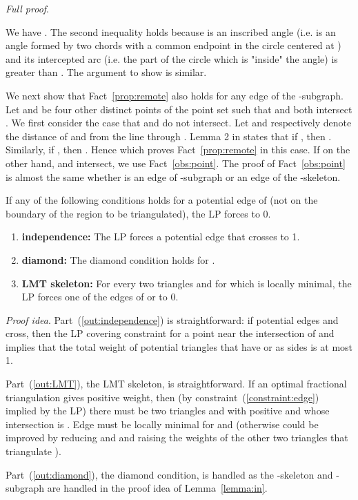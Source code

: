 \documentclass[final]{siamltex}
\newenvironment{proofidea}{\par{\it Proof idea}. \ignorespaces}{}
\newenvironment{fullproof}{\par{\it Full proof}. \ignorespaces}{\endproof}
\begin{document}
\begin{fullproof}
\begin{window}
We have . The second inequality holds because
 is an inscribed angle (i.e. is an angle formed by two chords with a 
common endpoint in the circle centered at ) and its intercepted arc (i.e. the part of the circle 
which is "inside" the angle) is greater than . The argument to show 
is similar.
\end{window}
We next show that Fact~\ref{prop:remote} 
also holds for any edge  of the -subgraph.
Let  and  be four other distinct points of the point set 
such that  and  both intersect .
We first consider the case that  and  do not intersect.
Let  and  respectively denote the distance of  and  from the line through . 
Lemma 2 in \cite{yang1994chain} states that if , then . 
Similarly, if , then . Hence 
which proves Fact~\ref{prop:remote} in this case. 
If on the other hand,  and  intersect, we use Fact~\ref{obs:point}. The proof of 
Fact~\ref{obs:point} is almost the same whether  is an edge of -subgraph or an edge of
the -skeleton.
\end{fullproof}



\begin{lemma}\label{lemma:out}
  If any of the following conditions holds for a potential edge  of  
  (not on the boundary of the region to be triangulated),
  the LP forces  to 0.
  \begin{enumerate}
  \item \label{out:independence} {\bf independence:}
    The LP forces a potential edge that crosses  to 1.  
\item \label{out:diamond}
    {\bf diamond:} The diamond condition holds for .
\item \label{out:LMT} {\bf LMT skeleton:}
    For every two triangles  and  for which  is locally minimal,
    the LP forces one of the edges of  or  to 0.
 \end{enumerate}
\end{lemma}

\begin{proofidea}
  Part~(\ref{out:independence}) is straightforward: if potential edges  and  cross,
  then the LP covering constraint for a point near the intersection of  and 
  implies that the total weight of potential triangles that have  or  as sides is at most 1.

  Part~(\ref{out:LMT}), the LMT skeleton, is straightforward.
  If an optimal fractional triangulation  gives  positive weight,
  then (by constraint~(\ref{constraint:edge}) implied by the LP)
  there must be two triangles  and  with positive  and 
  whose intersection is .
  Edge  must be locally minimal for  and  
  (otherwise  could be improved by reducing  and 
  and raising the weights of the other two triangles that triangulate ).

  Part~(\ref{out:diamond}), the diamond condition, 
  is handled as the -skeleton and -subgraph
  are handled in the proof idea of Lemma~\ref{lemma:in}.
\end{proofidea}
\end{document}
